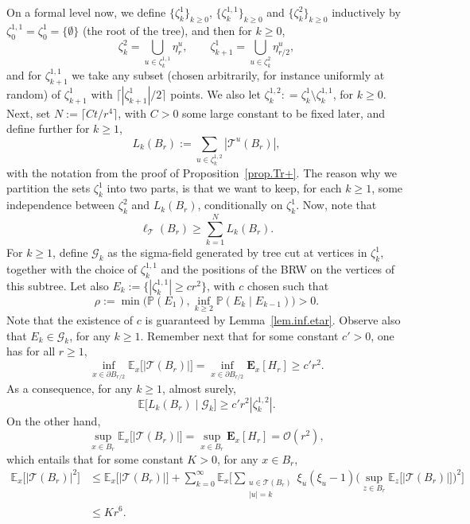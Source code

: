\documentclass[11pt]{article}
\numberwithin{equation}{section}
\let\ts\textstyle
\theoremstyle{plain}
\theoremstyle{definition}
\newcommand{\1}{{\text{\Large $\mathfrak 1$}}}
\begin{document}
On a formal level now, we define $\{\zeta_k^1\}_{k\ge 0}$,
$\{\zeta_k^{1,1}\}_{k\ge 0}$ and $\{\zeta_k^2\}_{k\ge 0}$ inductively by
$\zeta_0^{1,1} = \zeta_0^1 = \{\emptyset\}$ (the root of the tree), and then for $k\ge 0$,
\[
\zeta_k^2 = \bigcup_{u\in \zeta_k^{1,1}}
\eta^u_r, \qquad \zeta_{k+1}^1 = \bigcup_{u\in \zeta_k^2}
\eta^u_{r/2},
\]
and for $\zeta_{k+1}^{1,1}$ we take any subset (chosen arbitrarily, for instance uniformly at random) of $\zeta_{k+1}^1$
with $\lceil |\zeta_{k+1}^1|/2\rceil$ points. We also let $\zeta_k^{1,2}: = \zeta_k^1\setminus \zeta_k^{1,1}$, for $k\ge 0$.
Next, set $N:=\lceil Ct/r^4\rceil$, with $C>0$ some large constant to be fixed later, and define further for $k\ge 1$,
\[
L_k(B_r):= \sum_{u\in \zeta_k^{1,2}} |\mathcal T^u(B_r)|,
\]
with the notation from the proof of Proposition~\ref{prop.Tr+}. The reason why we partition the sets $\zeta_k^1$ into two parts, is that we want to keep,
for each $k\ge 1$, some independence between $\zeta_k^2$ and $L_k(B_r)$, conditionally on $\zeta_k^1$.
Now, note that
\begin{equation}\label{ellinfty}
\ell_{\mathcal T}(B_r) \ge \sum_{k=1}^N L_k(B_r).
\end{equation}
For $k\ge 1$, define $\mathcal G_k$ as the sigma-field generated by tree cut at vertices in $\zeta_k^1$, together with the choice of $\zeta_k^{1,1}$ and the positions of the BRW on the vertices of this subtree. Let also $E_k:=\{|\zeta_k^{1,1}|\ge cr^2\}$, with $c$ chosen such that
\begin{equation}\label{rho.def}
\rho:=\min\Big(\mathbb P(E_1), \inf_{k\ge 2} \mathbb P(E_k\mid E_{k-1})\Big)>0.
\end{equation}
Note that the existence of $c$ is
guaranteed by Lemma~\ref{lem.inf.etar}. Observe also that $E_k\in \mathcal G_k$, for any $k\ge 1$.
Remember next that for some constant $c'>0$, one has for all $r\ge 1$,
\[
\inf_{x\in \partial B_{r/2}} \mathbb E_x\big[|\mathcal T(B_r)|\big] = \inf_{x\in \partial B_{r/2}} \mathbf E_x[H_r]\ge c'r^2.
\]
As a consequence, for any $k\ge 1$, almost surely,
\[
\mathbb E \big[L_k(B_r)\mid \mathcal G_k]\ge c'r^2|\zeta_k^{1,2}|.
\]
On the other hand,
\[
\sup_{x\in B_r} \mathbb E_x\big[|\mathcal T(B_r)|\big] =\sup_{x\in B_r} \mathbf E_x[H_r] = \mathcal O(r^2),
\]
which entails that for some constant $K>0$, for any $x\in B_r$,
\begin{align*}
\mathbb E_x\big[|\mathcal T(B_r)|^2\big]
&\le \mathbb E_x \big[|\mathcal T(B_r)|\big]
+ \sum_{k=0}^\infty \mathbb E_x\Big[{\ts\sum_{\substack{u\in \mathcal T(B_r) \\ |u|=k}}} \xi_u(\xi_u-1)\Big(\sup_{z\in B_r}
\mathbb E_z\big[|\mathcal T(B_r)|\big]\Big)^2\Big]\\
&\le Kr^6.
\end{align*}
\end{document}
